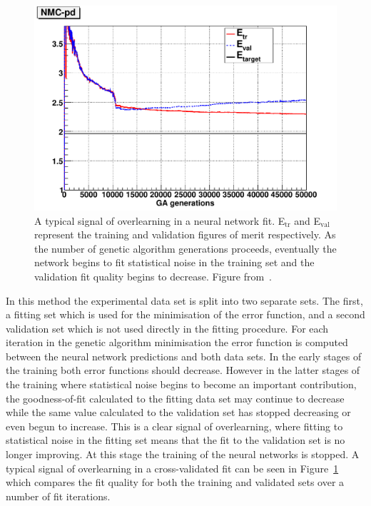 \begin{figure}[t!]
\centering
\includegraphics[scale=0.5]{3-PDFdet/figs/chi2ite-1004-NMC-pd.pdf}
\caption[Demonstration of overlearning in the cross-validation of a neural network fit]{A typical signal of overlearning in a neural network fit. E$_{\mathrm{tr}}$ and E$_{\mathrm{val}}$ represent the training and validation figures of merit respectively. As the number of genetic algorithm generations proceeds, eventually the network begins to fit statistical noise in the training set and the validation fit quality begins to decrease. Figure from~\cite{Ball:2010de}.}
\label{fig:crossval}
\end{figure}

In this method the experimental data set is split into two separate sets. The first, a fitting set which is used for the minimisation of the error function, and a second validation set which is not used directly in the fitting procedure. For each iteration in the genetic algorithm minimisation the error function is computed between the neural network predictions and both data sets. In the early stages of the training both error functions should decrease. However in the latter stages of the training where statistical noise begins to become an important contribution, the goodness-of-fit calculated to the fitting data set may continue to decrease while the same value calculated to the validation set has stopped decreasing or even begun to increase. This is a clear signal of overlearning, where fitting to statistical noise in the fitting set means that the fit to the validation set is no longer improving. At this stage the training of the neural networks is stopped. A typical signal of overlearning in a cross-validated fit can be seen in Figure~\ref{fig:crossval} which compares the fit quality for both the training and validated sets over a number of fit iterations.

